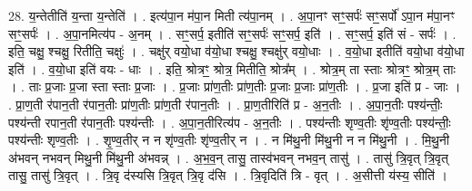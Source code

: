 \documentclass[17pt]{extarticle}
\begin{document}
28. य॒न्तेतीति॑ य॒न्ता य॒न्तेति॑ । . इत्य॑पा॒न म॑पा॒न मिती त्य॑पा॒नम् । . अ॒पा॒नꣳ सꣳ॒॒सर्पः॑ सꣳ॒॒सर्पो॑ ऽपा॒न म॑पा॒नꣳ सꣳ॒॒सर्पः॑ । . अ॒पा॒नमित्य॑प - अ॒नम् । . सꣳ॒॒सर्प॒ इतीति॑ सꣳ॒॒सर्पः॑ सꣳ॒॒सर्प॒ इति॑ । . सꣳ॒॒सर्प॒ इति॑ सं - सर्पः॑ । . इति॒ चक्षु॒ श्चक्षु॒ रितीति॒ चक्षुः॑ । . चक्षु॑र् वयो॒धा व॑यो॒धा श्चक्षु॒ श्चक्षु॑र् वयो॒धाः । . व॒यो॒धा इतीति॑ वयो॒धा व॑यो॒धा इति॑ । . व॒यो॒धा इति॑ वयः - धाः । . इति॒ श्रोत्रꣳ॒॒ श्रोत्र॒ मितीति॒ श्रोत्र᳚म् । . श्रोत्र॒म् ता स्ताः श्रोत्रꣳ॒॒ श्रोत्र॒म् ताः । . ताः प्र॒जाः प्र॒जा स्ता स्ताः प्र॒जाः । . प्र॒जाः प्रा॑ण॒तीः प्रा॑ण॒तीः प्र॒जाः प्र॒जाः प्रा॑ण॒तीः । . प्र॒जा इति॑ प्र - जाः । . प्रा॒ण॒ती र॑पान॒ती र॑पान॒तीः प्रा॑ण॒तीः प्रा॑ण॒ती र॑पान॒तीः । . प्रा॒ण॒तीरिति॑ प्र - अ॒न॒तीः । . अ॒पा॒न॒तीः पश्य॑न्तीः॒ पश्य॑न्ती रपान॒ती र॑पान॒तीः पश्य॑न्तीः । . अ॒पा॒न॒तीरित्य॑प - अ॒न॒तीः । . पश्य॑न्तीः शृण्व॒तीः शृ॑ण्व॒तीः पश्य॑न्तीः॒ पश्य॑न्तीः शृण्व॒तीः । . शृ॒ण्व॒तीर् न न शृ॑ण्व॒तीः शृ॑ण्व॒तीर् न । . न मि॑थु॒नी मि॑थु॒नी न न मि॑थु॒नी । . मि॒थु॒नी अ॑भवन् नभवन् मिथु॒नी मि॑थु॒नी अ॑भवन्न् । . अ॒भ॒व॒न् तासु॒ तास्व॑भवन् नभव॒न् तासु॑ । . तासु॑ त्रि॒वृत् त्रि॒वृत् तासु॒ तासु॑ त्रि॒वृत् । . त्रि॒वृ द॑स्यसि त्रि॒वृत् त्रि॒वृ द॑सि । . त्रि॒वृदिति॑ त्रि - वृत् । . अ॒सीत्ती य॑स्य॒ सीति॑ । \newline
\end{document}
